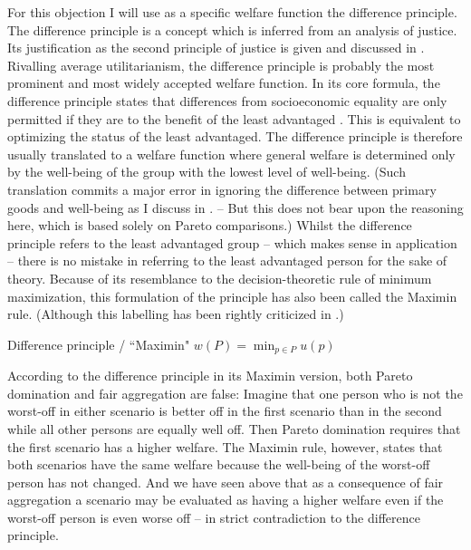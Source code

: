 For this objection I will use as a specific welfare function the difference principle. The difference principle is a concept which is inferred from an analysis of justice. Its justification as the second principle of justice is given and discussed in \cite[pp.~3-183]{rawls_2005}. Rivalling average utilitarianism, the difference principle is probably the most prominent and most widely accepted welfare function. In its core formula, the difference principle states that differences from socioeconomic equality are only permitted if they are to the benefit of the least advantaged \cite[p.~302]{rawls_2005}. This is equivalent to optimizing the status of the least advantaged. The difference principle is therefore usually translated to a welfare function where general welfare is determined only by the well-being of the group with the lowest level of well-being. (Such translation commits a major error in ignoring the difference between primary goods and well-being as I discuss in . – But this does not bear upon the reasoning here, which is based solely on Pareto comparisons.) Whilst the difference principle refers to the least advantaged group – which makes sense in application – there is no mistake in referring to the least advantaged person for the sake of theory. Because of its resemblance to the decision-theoretic rule of minimum maximization, this formulation of the principle has also been called the Maximin rule. (Although this labelling has been rightly criticized in .) 

\begin{Definition}{Difference principle / “Maximin"}{} 
$w(P) = \min_{p\in P} u(p)$
\end{Definition}

According to the difference principle in its Maximin version, both Pareto domination and fair aggregation are false: Imagine that one person who is not the worst-off in either scenario is better off in the first scenario than in the second while all other persons are equally well off. Then Pareto domination requires that the first scenario has a higher welfare. The Maximin rule, however, states that both scenarios have the same welfare because the well-being of the worst-off person has not changed. And we have seen above that as a consequence of fair aggregation a scenario may be evaluated as having a higher welfare even if the worst-off person is even worse off – in strict contradiction to the difference principle.  

